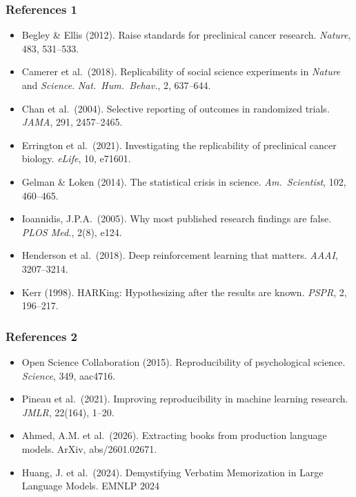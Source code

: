 \documentclass[]{beamer}
\begin{document}
\begin{frame}[fragile]
\frametitle{References 1}
{\scriptsize
\begin{itemize}
\setlength\itemsep{0.25em}
\item Begley \& Ellis (2012). Raise standards for preclinical cancer research. \textit{Nature}, 483, 531--533.
\item Camerer et al.\ (2018). Replicability of social science experiments in \textit{Nature} and \textit{Science}. \textit{Nat.\ Hum.\ Behav.}, 2, 637--644.
\item Chan et al.\ (2004). Selective reporting of outcomes in randomized trials. \textit{JAMA}, 291, 2457--2465.
\item Errington et al.\ (2021). Investigating the replicability of preclinical cancer biology. \textit{eLife}, 10, e71601.
\item Gelman \& Loken (2014). The statistical crisis in science. \textit{Am.\ Scientist}, 102, 460--465.
\item Ioannidis, J.P.A.\ (2005). Why most published research findings are false. \textit{PLOS Med.}, 2(8), e124.
\item Henderson et al.\ (2018). Deep reinforcement learning that matters. \textit{AAAI}, 3207--3214.
\item Kerr (1998). HARKing: Hypothesizing after the results are known. \textit{PSPR}, 2, 196--217.
\end{itemize}
}

\end{frame}

\begin{frame}[fragile]
\frametitle{References 2}
{\scriptsize
\begin{itemize}
\setlength\itemsep{0.25em}
\item Open Science Collaboration (2015). Reproducibility of psychological science. \textit{Science}, 349, aac4716.
\item Pineau et al.\ (2021). Improving reproducibility in machine learning research. \textit{JMLR}, 22(164), 1--20.
\item Ahmed, A.M. et al.\ (2026). Extracting books from production language models. ArXiv, abs/2601.02671.
\item Huang, J. et al.\ (2024). Demystifying Verbatim Memorization in Large Language Models. EMNLP 2024
\end{itemize}
}
\end{frame}
\end{document}
